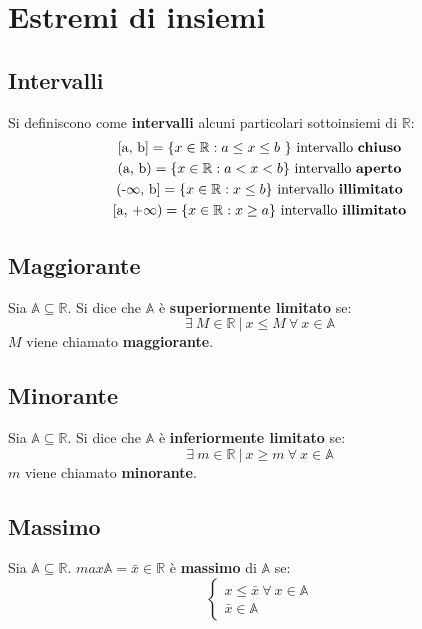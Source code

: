 \chapter{Estremi di insiemi}
\label{sec: estremiInsiemi}
\section{Intervalli}
Si definiscono come \textbf{intervalli} alcuni particolari sottoinsiemi di $\mathbb{R}$:
\begin{equation}
\begin{gathered}
$[a, b$] = \{x\in\mathbb{R}: a\le x\le b\ \} \text{ intervallo \textbf{chiuso}}\\
$(a, b$) = \{x\in\mathbb{R}: a < x < b\} \text{ intervallo \textbf{aperto}}\\
$(-$\infty$, b$] = \{x\in\mathbb{R}: x\le b\} \text{ intervallo \textbf{illimitato}}\\
$[a, +$\infty$$) = \{x\in\mathbb{R}: x\ge a\} \text{ intervallo \textbf{illimitato}}\\
\end{gathered}
\end{equation}
\section{Maggiorante}
Sia $\mathbb{A} \subseteq \mathbb{R}$. Si dice che $\mathbb{A}$ è \textbf{superiormente limitato} se:
\begin{equation}
\exists\ M \in \mathbb{R}\ |\ x \leq M\ \forall\ x \in \mathbb{A}
\end{equation}
$M$ viene chiamato \textbf{maggiorante}.
\section{Minorante}
Sia $\mathbb{A} \subseteq \mathbb{R}$. Si dice che $\mathbb{A}$ è \textbf{inferiormente limitato} se:
\begin{equation}
\exists\ m \in \mathbb{R}\ |\ x \geq m\ \forall\ x \in \mathbb{A}
\end{equation}
$m$ viene chiamato \textbf{minorante}.
\section{Massimo}
Sia $\mathbb{A} \subseteq \mathbb{R}$. $max\mathbb{A}=\bar{x} \in \mathbb{R}$ è \textbf{massimo} di $\mathbb{A}$ se:
\begin{equation}
\begin{cases}
x \leq \bar{x}\ \forall\ x \in \mathbb{A}\\
\bar{x} \in \mathbb{A}
\end{cases}
\end{equation}
